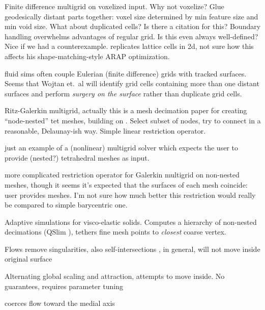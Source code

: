 \cite{McAdams:2011} Finite difference multigrid on voxelized input. Why not
voxelize? Glue geodesically distant parts together: voxel size determined by
min feature size and min void size. What about duplicated cells? Is there a
citation for this? Boundary handling overwhelms advantages of regular grid. Is
this even always well-defined? Nice if we had a counterexample.
\cite{Sykora09} replicates lattice cells in 2d, not sure how this affects his
shape-matching-style ARAP optimization.

\cite{wojtan2011liquid} fluid sims often couple Eulerian (finite difference)
grids with tracked surfaces. Seems that Wojtan et.\ al will identify grid cells
containing more than one distant surfaces and perform \emph{surgery on the
surface} rather than duplicate grid cells.

\cite{Adams:1999:PMS} Ritz-Galerkin multigrid, actually this is a mesh
decimation paper for creating ``node-nested'' tet meshes, building on
\cite{guillard1993}. Select subset of nodes, try to connect in a reasonable,
Delaunay-ish way. Simple linear restriction operator.

\cite{fish1995efficient} just an example of a (nonlinear) multigrid solver
which expects the user to provide (nested?) tetrahedral meshes as input.

\cite{feng1997non} more complicated restriction operator for Galerkin multigrid
on non-nested meshes, though it seems it's expected that the surfaces of each
mesh coincide: user provides meshes. I'm not sure how much better this
restriction would really be compared to simple barycentric one.

\cite{Debunne:2001:DRD} 
Adaptive simulations for visco-elastic solids. Computes a hierarchy of
non-nested decimations (QSlim \cite{Garland:1997:SSU}), tethers fine mesh
points to \emph{closest} coarse vertex.

Flows
\cite{Kazhdan2012} remove singularities, also self-intersections
\cite{Sacht:SIV:2013}, in general, will not move inside original surface

Alternating global scaling and attraction, attempts to move inside. No
guarantees, requires parameter tuning \cite{Wang:2008}

\cite{Tagliasacchi:2012:MCS} coerces flow toward the medial axis

